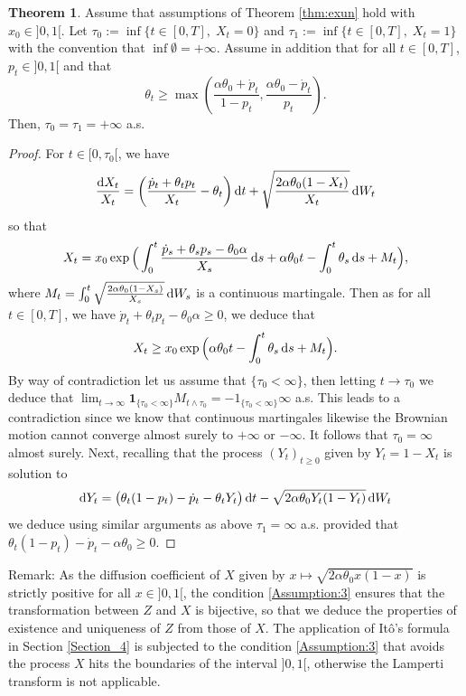 \documentclass[11pt]{article}
\theoremstyle{definition}
\newtheorem{Thm}[Def]{Theorem}
\begin{document}
\begin{Thm}\label{thm:mod2}
Assume that assumptions of Theorem \ref{thm:exun} hold with $x_0\in]0,1[$.
Let $\tau_0:=\inf \{t\in[0,T],\; X_t=0\}$ and  $\tau_1:=\inf \{t\in[0,T],\; X_t=1\}$ with the convention that $\inf\emptyset=+\infty$. Assume in addition that for all $t\in[0,T]$,  $p_t\in]0,1[$ and that
\begin{equation}\label{Assumption:3}
\theta_t\geq \max\left(\frac{\alpha\theta_0+\dot p_t}{1-p_t},\frac{\alpha\theta_0-\dot p_t}{p_t}\right)\tag{B}. 
\end{equation}
 Then, $\tau_0=\tau_1=+\infty$ a.s.
\end{Thm}

\begin{proof}
For $t\in[0,\tau_0[$, we have 
$$
\frac{\dif X_t}{X_t}= \left(\frac{\dot p_t +\theta_t p_t}{X_t} - \theta_t\right)\dif t  +\sqrt{\frac{2\alpha \theta_0 (1-X_t)}{X_t}} \dif W_t 
$$  
so that
$$
X_t=x_0\exp\Big(\int_0^t \frac{\dot p_s +\theta_sp_s- \theta_0 \alpha}{X_s}\dif s+\alpha\theta_0 t-  \int_0^t\theta_s\dif s + M_t\Big),
$$
where $M_t=\int_0^t\sqrt{\frac{2\alpha \theta_0 (1-X_s)}{X_s}} \dif W_s$ is a continuous martingale. Then as for all $t\in[0,T]$, we have $\dot p_t +\theta_tp_t- \theta_0 \alpha\ge0$, we deduce that
$$
X_t\ge x_0\exp\Big(\alpha\theta_0 t-  \int_0^t\theta_s\dif s + M_t\Big).
$$
By way of contradiction let us assume that  $\{\tau_0<\infty\}$, then letting $t\to \tau_0$ we deduce that $\lim_{t\to \infty} \mathbf 1_{\{\tau_0<\infty\}}M_{t\wedge \tau_0}=\mathbf -1_{\{\tau_0<\infty\}}\infty$ a.s. This leads to a contradiction since we know that continuous martingales likewise the Brownian motion cannot converge  almost surely to $+\infty$ or $-\infty$. It follows that $\tau_0=\infty$ almost surely. Next, recalling that  the process $(Y_t)_{t\geq 0}$  given by $Y_t=1-X_t$ is solution to 
$$
\dif Y_t= \big( \theta_t(1-p_t) -\dot p_t - \theta_tY_t  \big)\dif t  -\sqrt{2\alpha \theta_0 Y_t(1-Y_t)} \dif W_t 
$$
we deduce using similar arguments as above 
$\tau_1=\infty$ a.s. provided that $\theta_t(1-p_t) -\dot p_t -\alpha \theta_0 \ge 0$.
 \end{proof} 

Remark: As the diffusion coefficient of $X$  given by  $x \mapsto \sqrt{2 \alpha \theta_0 x(1-x)}$  is strictly positive for all $x \in  ]0,1[$, the condition \eqref{Assumption:3}  ensures that the transformation between $Z$ and $X$ is bijective, so that we deduce the properties of existence and uniqueness of $Z$ from those of $X$. The application of  It\^{o}'s formula in Section \ref{Section_4} is subjected to the condition \eqref{Assumption:3} that avoids the process $X$ hits the boundaries of the interval $ ]0,1[$, otherwise the Lamperti transform is not applicable. 



\nocite{*}
 
\printbibliography[keyword={Wind-SDE},title={References}]
\end{document}
